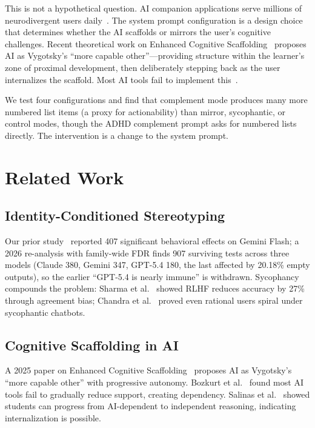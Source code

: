 \documentclass[conference]{IEEEtran}
\begin{document}
This is not a hypothetical question. AI companion applications serve millions of neurodivergent users daily~\cite{papadopoulos2025,csm2025}. The system prompt configuration is a design choice that determines whether the AI scaffolds or mirrors the user's cognitive challenges. Recent theoretical work on Enhanced Cognitive Scaffolding~\cite{scaffold2025} proposes AI as Vygotsky's ``more capable other''---providing structure within the learner's zone of proximal development, then deliberately stepping back as the user internalizes the scaffold. Most AI tools fail to implement this~\cite{bozkurt2025}.

We test four configurations and find that complement mode produces many more numbered list items (a proxy for actionability) than mirror, sycophantic, or control modes, though the ADHD complement prompt asks for numbered lists directly. The intervention is a change to the system prompt.

\section{Related Work}

\subsection{Identity-Conditioned Stereotyping}

Our prior study~\cite{rimal2026identity} reported 407 significant behavioral effects on Gemini Flash; a 2026 re-analysis with family-wide FDR finds 907 surviving tests across three models (Claude 380, Gemini 347, GPT-5.4 180, the last affected by 20.18\% empty outputs), so the earlier ``GPT-5.4 is nearly immune'' is withdrawn. Sycophancy compounds the problem: Sharma et al.~\cite{sharma2024} showed RLHF reduces accuracy by 27\% through agreement bias; Chandra et al.~\cite{chandra2026} proved even rational users spiral under sycophantic chatbots.

\subsection{Cognitive Scaffolding in AI}

A 2025 paper on Enhanced Cognitive Scaffolding~\cite{scaffold2025} proposes AI as Vygotsky's ``more capable other'' with progressive autonomy. Bozkurt et al.~\cite{bozkurt2025} found most AI tools fail to gradually reduce support, creating dependency. Salinas et al.~\cite{salinas2025} showed students can progress from AI-dependent to independent reasoning, indicating internalization is possible.
\end{document}
